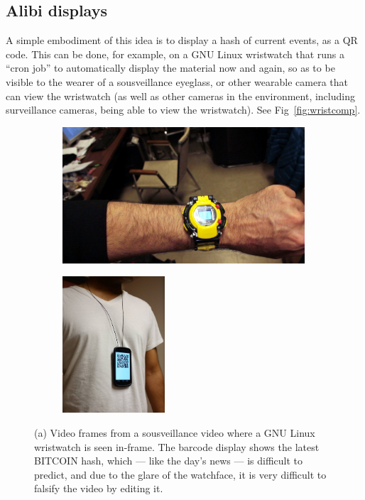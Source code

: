 \subsection{Alibi displays}
A simple embodiment of this idea is to display a hash of current events,
as a QR code.  This can be done, for example, on a GNU Linux wristwatch
that runs a ``cron job'' to automatically display the material now and 
again, so as to be visible to the wearer of a sousveillance eyeglass,
or other wearable camera that can view the wristwatch (as well as other
cameras in the environment, including surveillance cameras, being able
to view the wristwatch).
See Fig~\ref{fig:wristcomp}.
\begin{figure}[t]
\center
\begin{subfigure}[t]{4.0in}
   \centering
    \includegraphics[height=2.0in]{ch6/figs/wristcomp1.jpg}
    \caption{}
    \label{subfig:wristcomp}
\end{subfigure}
\begin{subfigure}[t]{2.0in}
   \centering
    \includegraphics[height=2.0in]{ch6/figs/qr_necklace_und2.jpg} 
    \caption{}
    \label{subfig:qrnecklace}   
\end{subfigure}
  \caption{(a) Video frames from a sousveillance video where a GNU Linux
           wristwatch is seen in-frame.  The barcode display shows the
           latest BITCOIN hash, which --- like the day's news --- is
           difficult to predict, and due to the glare of the watchface, it
           is very difficult to falsify the video by editing it.
}
\end{figure}
